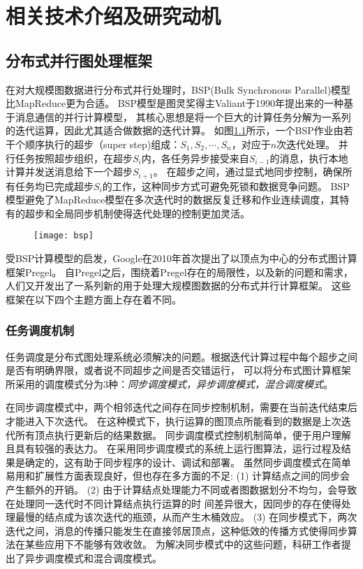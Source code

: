 \chapter{相关技术介绍及研究动机}
\section{分布式并行图处理框架}
在对大规模图数据进行分布式并行处理时，BSP(Bulk Synchronous Parallel)模型\cite{bsp@1990}比MapReduce更为合适。
BSP模型是图灵奖得主Valiant于1990年提出来的一种基于消息通信的并行计算模型，
其核心思想是将一个巨大的计算任务分解为一系列的迭代运算，因此尤其适合做数据的迭代计算。
如图\ref{fig:bsp}所示，一个BSP作业由若干个顺序执行的超步（super step)组成：$S_1,S_2,\cdots,S_n$，对应于$n$次迭代处理。
并行任务按照超步组织，在超步$S_i$内，各任务异步接受来自$S_{i-1}$的消息，执行本地计算并发送消息给下一个超步$S_{i+1}$。
在超步之间，通过显式地同步控制，确保所有任务均已完成超步$S_i$的工作，这种同步方式可避免死锁和数据竞争问题。
BSP模型避免了MapReduce模型在多次迭代时的数据反复迁移和作业连续调度，其特有的超步和全局同步机制使得迭代处理的控制更加灵活。

\begin{figure}[!htbp]
  \centering
  \texttt{[image: bsp]}
  \label{fig:bsp}
\end{figure}

受BSP计算模型的启发，Google在2010年首次提出了以顶点为中心的分布式图计算框架Pregel\cite{Malewicz@SIGMOD10}。
自Pregel之后，围绕着Pregel存在的局限性，以及新的问题和需求，人们又开发出了一系列新的用于处理大规模图数据的分布式并行计算框架。
这些框架在以下四个主题方面上存在着不同。

\subsection{任务调度机制}
任务调度是分布式图处理系统必须解决的问题。根据迭代计算过程中每个超步之间是否有明确界限，或者说不同超步之间是否交错运行，
可以将分布式图计算框架所采用的调度模式分为3种：\textit{同步调度模式，异步调度模式，混合调度模式}。

在同步调度模式中，两个相邻迭代之间存在同步控制机制，需要在当前迭代结束后才能进入下次迭代。
在这种模式下，执行运算的图顶点所能看到的数据是上次迭代所有顶点执行更新后的结果数据。
同步调度模式控制机制简单，便于用户理解且具有较强的表达力。
在采用同步调度模式的系统上运行图算法，运行过程及结果是确定的，这有助于同步程序的设计、调试和部署。    
虽然同步调度模式在简单易用和扩展性方面表现良好，但也存在多方面的不足:
(1) 计算结点之间的同步会产生额外的开销。
(2) 由于计算结点处理能力不同或者图数据划分不均匀，会导致在处理同一迭代时不同计算结点执行运算的时
间差异很大，因同步的存在使得处理最慢的结点成为该次迭代的瓶颈，从而产生木桶效应。
(3) 在同步模式下，两次迭代之间，消息的传播只能发生在直接邻居顶点，这种低效的传播方式使得同步算法在某些应用下不能够有效收敛。
为解决同步模式中的这些问题，科研工作者提出了异步调度模式和混合调度模式。

